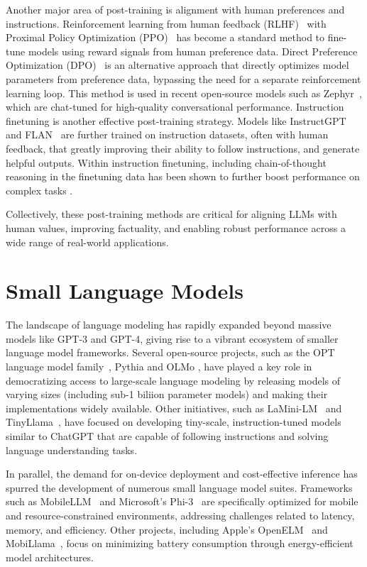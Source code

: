 Another major area of post-training is alignment with human preferences and instructions. Reinforcement learning from human feedback (RLHF)~\citep{christiano2017deep, ouyang2022training} with Proximal Policy Optimization (PPO)~\citep{schulman2017proximal} has become a standard method to fine-tune models using reward signals from human preference data. Direct Preference Optimization (DPO)~\citep{rafailov2023direct} is an alternative approach that directly optimizes model parameters from preference data, bypassing the need for a separate reinforcement learning loop. This method is used in recent open-source models such as Zephyr~\citep{huggingface2023zephyr}, which are chat-tuned for high-quality conversational performance. Instruction finetuning is another effective post-training strategy. Models like InstructGPT~\citep{ouyang2022training} and FLAN~\citep{wei2021flan} are further trained on instruction datasets, often with human feedback, that greatly improving their ability to follow instructions, and generate helpful outputs. Within instruction finetuning, including chain-of-thought reasoning in the finetuning data has been shown to further boost performance on complex tasks \citep{wei2022chain}.

Collectively, these post-training methods are critical for aligning LLMs with human values, improving factuality, and enabling robust performance across a wide range of real-world applications.

\section{Small Language Models}

The landscape of language modeling has rapidly expanded beyond massive models like GPT-3 and GPT-4, giving rise to a vibrant ecosystem of smaller language model frameworks. Several open-source projects, such as the OPT language model family~\citep{zhang2022opt}, Pythia \citep{biderman2023pythia} and OLMo \citep{groeneveld2024olmo}, have played a key role in democratizing access to large-scale language modeling by releasing models of varying sizes (including sub-1 biliion parameter models) and making their implementations widely available. Other initiatives, such as LaMini-LM~\citep{wu2024lamini} and TinyLlama~\citep{zhang2024tinyllama}, have focused on developing tiny-scale, instruction-tuned models similar to ChatGPT that are capable of following instructions and solving language understanding tasks.

In parallel, the demand for on-device deployment and cost-effective inference has spurred the development of numerous small language model suites. Frameworks such as MobileLLM~\citep{liu2024mobilellm} and Microsoft's Phi-3~\citep{abdin2024phi} are specifically optimized for mobile and resource-constrained environments, addressing challenges related to latency, memory, and efficiency. Other projects, including Apple's OpenELM~\citep{mehta2024openelm} and MobiLlama~\citep{thawakar2024mobillama}, focus on minimizing battery consumption through energy-efficient model architectures.


